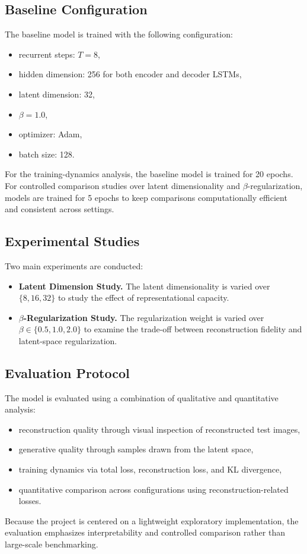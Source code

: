 \documentclass[11pt,a4paper]{article}
\begin{document}
\subsection{Baseline Configuration}
The baseline model is trained with the following configuration:
\begin{itemize}
    \item recurrent steps: $T = 8$,
    \item hidden dimension: 256 for both encoder and decoder LSTMs,
    \item latent dimension: 32,
    \item $\beta = 1.0$,
    \item optimizer: Adam,
    \item batch size: 128.
\end{itemize}
For the training-dynamics analysis, the baseline model is trained for 20 epochs. For controlled comparison studies over latent dimensionality and $\beta$-regularization, models are trained for 5 epochs to keep comparisons computationally efficient and consistent across settings.
\subsection{Experimental Studies}
Two main experiments are conducted:
\begin{itemize}
    \item \textbf{Latent Dimension Study.} The latent dimensionality is varied over $\{8,16,32\}$ to study the effect of representational capacity.
    \item \textbf{$\beta$-Regularization Study.} The regularization weight is varied over $\beta \in \{0.5, 1.0, 2.0\}$ to examine the trade-off between reconstruction fidelity and latent-space regularization.
\end{itemize}
\subsection{Evaluation Protocol}
The model is evaluated using a combination of qualitative and quantitative analysis:
\begin{itemize}
    \item reconstruction quality through visual inspection of reconstructed test images,
    \item generative quality through samples drawn from the latent space,
    \item training dynamics via total loss, reconstruction loss, and KL divergence,
    \item quantitative comparison across configurations using reconstruction-related losses.
\end{itemize}
Because the project is centered on a lightweight exploratory implementation, the evaluation emphasizes interpretability and controlled comparison rather than large-scale benchmarking.
\end{document}
